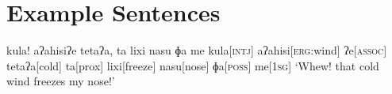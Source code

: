 \part{Example Sentences}








\ex
\begingl
\glpreamble kula! aʔahisiʔe tetaʔa, ta lixi nasu ɸa me\endpreamble
kula[\textsc{intj}]
aʔahisi[\textsc{erg:}wind]
ʔe[\textsc{assoc}]
tetaʔa[cold]
ta[prox]
lixi[freeze]
nasu[nose]
ɸa[\textsc{poss}]
me[\textsc{1sg}]
\glft `Whew! that cold wind freezes my nose!'
\endgl
\xe
